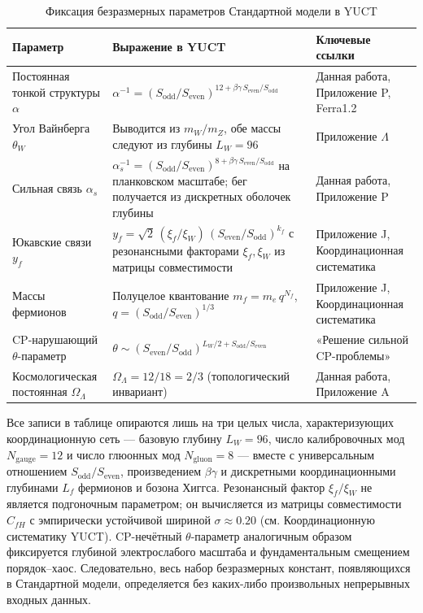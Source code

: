 \documentclass[12pt,a4paper]{article}
\begin{document}
	\begin{table}[htbp]
		\centering
		\caption{Фиксация безразмерных параметров Стандартной модели в YUCT}
		\label{tab:SMparams}
		\small
		\begin{tabular}{@{}p{3.0cm} p{5.2cm} p{5.2cm}@{}}
			\toprule
			\textbf{Параметр} & \textbf{Выражение в YUCT} & \textbf{Ключевые ссылки} \\
			\midrule
			Постоянная тонкой структуры \(\alpha\) &
			\(\alpha^{-1} = (S_{\mathrm{odd}}/S_{\mathrm{even}})^{12+\beta\gamma\,S_{\mathrm{even}}/S_{\mathrm{odd}}}\) &
			Данная работа, Приложение P, Ferra1.2 \\
			Угол Вайнберга \(\theta_W\) &
			Выводится из \(m_W/m_Z\), обе массы следуют из глубины \(L_W=96\) &
			Приложение \(\Lambda\) \\
			Сильная связь \(\alpha_s\) &
			\(\alpha_s^{-1} = (S_{\mathrm{odd}}/S_{\mathrm{even}})^{8+\beta\gamma\,S_{\mathrm{even}}/S_{\mathrm{odd}}}\) на планковском масштабе; бег получается из дискретных оболочек глубины &
			Данная работа, Приложение P \\
			Юкавские связи \(y_f\) &
			\(y_f = \sqrt{2}\,(\xi_f/\xi_W)\,(S_{\mathrm{even}}/S_{\mathrm{odd}})^{k_f}\) с резонансными факторами \(\xi_f,\xi_W\) из матрицы совместимости &
			Приложение J, Координационная систематика \\
			Массы фермионов & Полуцелое квантование \(m_f = m_e\,q^{N_f}\), \(q=(S_{\mathrm{odd}}/S_{\mathrm{even}})^{1/3}\) &
			Приложение J, Координационная систематика \\
			CP-нарушающий \(\theta\)-параметр &
			\(\theta \sim (S_{\mathrm{even}}/S_{\mathrm{odd}})^{L_W/2 + S_{\mathrm{odd}}/S_{\mathrm{even}}}\) &
			«Решение сильной CP-проблемы» \\
			Космологическая постоянная \(\Omega_\Lambda\) &
			\(\Omega_\Lambda = 12/18 = 2/3\) (топологический инвариант) &
			Данная работа, Приложение A \\
			\bottomrule
		\end{tabular}
	\end{table}
	
	Все записи в таблице опираются лишь на три целых числа, характеризующих координационную сеть — базовую глубину \(L_W=96\), число калибровочных мод \(N_{\mathrm{gauge}}=12\) и число глюонных мод \(N_{\mathrm{gluon}}=8\) — вместе с универсальным отношением \(S_{\mathrm{odd}}/S_{\mathrm{even}}\), произведением \(\beta\gamma\) и дискретными координационными глубинами \(L_f\) фермионов и бозона Хиггса. Резонансный фактор \(\xi_f/\xi_W\) не является подгоночным параметром; он вычисляется из матрицы совместимости \(C_{fH}\) с эмпирически устойчивой шириной \(\sigma \approx 0.20\) (см. Координационную систематику YUCT). CP-нечётный \(\theta\)-параметр аналогичным образом фиксируется глубиной электрослабого масштаба и фундаментальным смещением порядок–хаос. Следовательно, весь набор безразмерных констант, появляющихся в Стандартной модели, определяется без каких-либо произвольных непрерывных входных данных.
	
\end{document}
